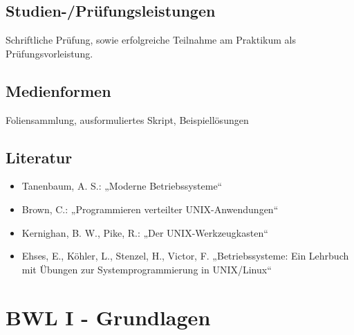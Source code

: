 \section*{Studien-/Prüfungsleistungen\label{/mi-2017/modulbeschreibungen-bachelor/BA_betriebssysteme-und-verteile-systeme}}\label{studien-pruxfcfungsleistungenpathlabelmi-2017modulbeschreibungen-bachelorbaux5fbetriebssysteme-und-verteile-systeme}

Schriftliche Prüfung, sowie erfolgreiche Teilnahme am Praktikum als
Prüfungsvorleistung.

\section*{Medienformen\label{/mi-2017/modulbeschreibungen-bachelor/BA_betriebssysteme-und-verteile-systeme}}\label{medienformenpathlabelmi-2017modulbeschreibungen-bachelorbaux5fbetriebssysteme-und-verteile-systeme}

Foliensammlung, ausformuliertes Skript, Beispiellösungen

\section*{Literatur\label{/mi-2017/modulbeschreibungen-bachelor/BA_betriebssysteme-und-verteile-systeme}}\label{literaturpathlabelmi-2017modulbeschreibungen-bachelorbaux5fbetriebssysteme-und-verteile-systeme}

\begin{itemize}
\tightlist
\item
  Tanenbaum, A. S.: „Moderne Betriebssysteme``
\item
  Brown, C.: „Programmieren verteilter UNIX-Anwendungen``
\item
  Kernighan, B. W., Pike, R.: „Der UNIX-Werkzeugkasten``
\item
  Ehses, E., Köhler, L., Stenzel, H., Victor, F. „Betriebssysteme: Ein
  Lehrbuch mit Übungen zur Systemprogrammierung in UNIX/Linux``
\end{itemize}

\chapter{BWL I -
Grundlagen\label{/mi-2017/modulbeschreibungen-bachelor/BA_BWL1}}\label{bwl-i---grundlagenpathlabelmi-2017modulbeschreibungen-bachelorbaux5fbwl1}

